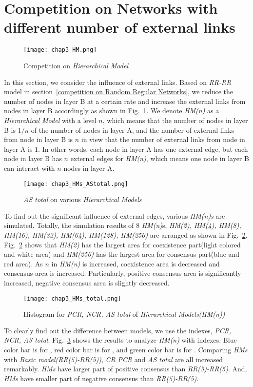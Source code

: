 \section{Competition on Networks with different number of external links}
\begin{figure}[!htb]
	\centering
	\texttt{[image: chap3\_HM.png]}
	\caption{Competition on \textit{Hierarchical Model}}
	\label{chap3_HM}
\end{figure}
In this section, we consider the influence of external links. Based on \textit{RR-RR} model in section~\ref{competition on Random Regular Networks}, we reduce the number of nodes in layer B at a certain rate and increase the external links from nodes in layer B accordingly as shown in Fig.~\ref{chap3_HM}.  We denote \textit{HM(n)} as a \textit{Hierarchical Model} with a level $n$, which means that the number of nodes in layer B is $1/n$ of the number of nodes in layer A, and the number of external links from node in layer B is $n$ in view that the number of external links from node in layer A is $1$. In other words, each node in layer A has one external edge, but each node in layer B has $n$ external edges for \textit{HM(n)}, which means one node in layer B can interact with $n$ nodes in layer A.
\begin{figure}[!htb]
	\centering
	\texttt{[image: chap3\_HMs\_AStotal.png]}
	\caption{\textit{AS total} on various \textit{Hierarchical Models}}
	\label{chap3_HMs_AStotal}
\end{figure}
To find out the significant influence of external edges, various \textit{HM(n)s} are simulated.  Totally, the simulation results of $8$ \textit{HM(n)}s, \textit{HM(2), HM(4), HM(8), HM(16), HM(32), HM(64), HM(128), HM(256)} are arranged as shown in Fig.~\ref{chap3_HMs_AStotal}.  
Fig.~\ref{chap3_HMs_AStotal} shows that \textit{HM(2)} has the largest area for coexistence part(light colored and white area) and \textit{HM(256)} has the largest area for consensus part(blue and red area). As $n$ in \textit{HM(n)} is increased, coexistence area is decreased and consensus area is increased. Particularly, positive consensus area is significantly increased, negative consensus area is slightly decreased. 
\begin{figure}[!htb]
	\centering
	\texttt{[image: chap3\_HMs\_total.png]}
	\caption{Histogram for \textit{PCR, NCR, AS total} of \textit{Hierarchical Models(HM(n))}}
	\label{chap3_HMs_total}
\end{figure}
To clearly find out the difference between models, we use the indexes, \textit{PCR, NCR, AS total}. Fig.~\ref{chap3_HMs_total} shows the results to analyze \textit{HM(n)} with indexes. Blue color bar is for , red color bar is for , and green color bar is for . Comparing \textit{HMs} with \textit{Basic model(RR(5)-RR(5))}, \textit{CR} \textit{PCR} and \textit{AS total} are all increased remarkably. \textit{HMs} have larger part of positive consensus than \textit{RR(5)-RR(5)}. And, \textit{HMs} have smaller part of negative consensus than \textit{RR(5)-RR(5)}. 

